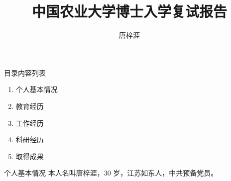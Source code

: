 \documentclass[xcolor=svgnames, t, aspectratio=169]{ctexbeamer}
\title{中国农业大学博士入学复试报告}
\date[2022/4/24]{\zhdate{2022/4/24}}
\author[唐梓涯]
{唐梓涯}
\institute
{
  \ciee
  
}
\begin{document}
{\taruwavesbg%
\begin{frame}
  \titlepage
\end{frame}
}

\begin{frame}{目录}{内容列表}
  \begin{enumerate}
    \item 个人基本情况
    \item 教育经历
    \item 工作经历
    \item 科研经历
    \item 取得成果
  \end{enumerate}
\end{frame}

\begin{frame}{个人基本情况}{}
  本人名叫唐梓涯，30 岁，江苏如东人，中共预备党员。
\end{frame}
\end{document}
